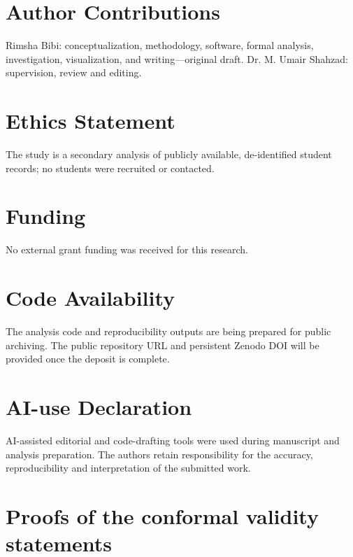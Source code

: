 \section*{Author Contributions}
Rimsha Bibi: conceptualization, methodology, software, formal analysis,
investigation, visualization, and writing---original draft.
Dr. M. Umair Shahzad: supervision, review and editing.

\section*{Ethics Statement}
The study is a secondary analysis of publicly available,
de-identified student records; no students were recruited or contacted.

\section*{Funding}
No external grant funding was received for this research.

\section*{Code Availability}
The analysis code and reproducibility outputs are being prepared for
public archiving. The public repository URL and persistent Zenodo DOI
will be provided once the deposit is complete.

\section*{AI-use Declaration}
AI-assisted editorial and code-drafting tools were used during manuscript
and analysis preparation. The authors retain responsibility for the
accuracy, reproducibility and interpretation of the submitted work.

\appendix
\section{Proofs of the conformal validity statements}\label{app:proofs}


